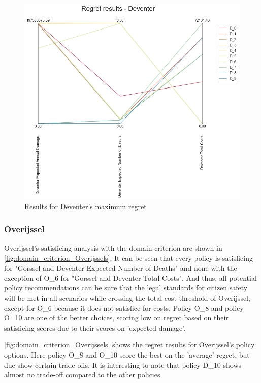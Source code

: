 \begin{figure}[H]
\begin{minipage}[b]{0.4\textwidth}
    \includegraphics[width=1.2\textwidth]{report/figures/results/regret_figure_Deventer.png}
    \caption{Results for Deventer's maximum regret}
    \label{fig:regret_Deventers}
  \end{minipage}
\end{figure}

\subsubsection{Overijssel}
Overijssel's satisficing analysis with the domain criterion are shown in \autoref{fig:domain_criterion_Overijssels}. It can be seen that every policy is satisficing for "Gorssel and Deventer Expected Number of Deaths" and none with the exception of O\_6 for "Gorssel and Deventer Total Costs". And thus, all potential policy recommendations can be sure that the legal standards for citizen safety will be met in all scenarios while crossing the total cost threshold of Overijssel, except for O\_6 because it does not satisfice for costs. 
Policy O\_8 and policy O\_10 are one of the better choices, scoring low on regret based on their satisficing scores due to their scores on 'expected damage'. \newline

\noindent \autoref{fig:domain_criterion_Overijssels} shows the regret results for Overijssel's policy options. Here policy O\_8 and O\_10 score the best on the 'average' regret, but due show certain trade-offs. It is interesting to note that policy D\_10 shows almost no trade-off compared to the other policies.

